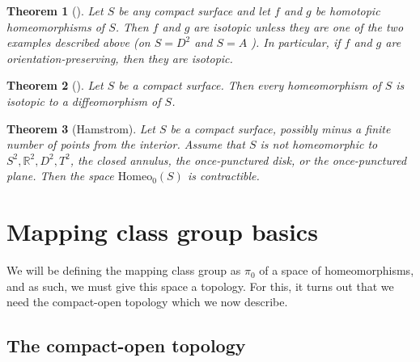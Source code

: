 \documentclass[reqno]{amsart}
\newtheorem{theorem}{Theorem}[section]
\theoremstyle{definition}
\theoremstyle{remark}
\newcommand{\Homeo}{{\mathrm{Homeo}}}
\begin{document}
\begin{theorem}[]
    Let $S$ be any compact surface and let $f$ and $g$ be
    homotopic homeomorphisms of $S$. Then $f$ and $g$ are
    isotopic unless they are one of the two examples described
    above (on $S = D^2$ and $S = A$ ). In particular,
    if $f$ and $g$ are orientation-preserving, then they
    are isotopic.
\end{theorem}



\begin{theorem}[]
    Let $S$ be a compact surface. Then every homeomorphism of
    $S$ is isotopic to a diffeomorphism of $S$.
\end{theorem}

\begin{theorem}[Hamstrom]
    Let $S$ be a compact surface, possibly minus a finite
    number of points from the interior. Assume that
    $S$ is not homeomorphic to
    $S^2, \mathbb{R}^2, D^2, T^2$, the closed annulus,
    the once-punctured disk, or the once-punctured plane. Then
    the space $\Homeo_0 (S)$ is contractible.
\end{theorem}




\newpage

\section{Mapping class group basics}

We will be defining the mapping class group as $\pi_0$
of a space of homeomorphisms, and as such, we must
give this space a topology. For this, it turns out that we need
the compact-open topology which we now describe.

\subsection*{The compact-open topology}
\end{document}
